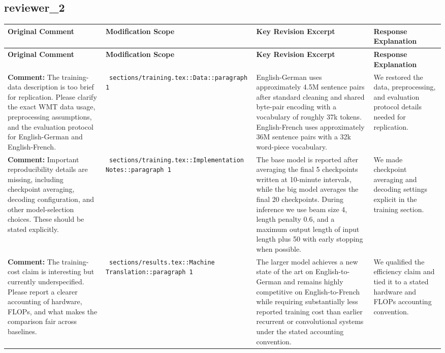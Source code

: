 \documentclass[11pt]{article}
\begin{document}
\subsection*{ reviewer\_2 }
\begin{longtable}{|p{}|p{}|p{}|p{}|}
\hline
\textbf{ Original Comment } & \textbf{ Modification Scope } & \textbf{ Key Revision Excerpt } & \textbf{ Response Explanation } \\
\hline
\endfirsthead
\hline
\textbf{ Original Comment } & \textbf{ Modification Scope } & \textbf{ Key Revision Excerpt } & \textbf{ Response Explanation } \\
\hline
\endhead
\textbf{ Comment: } The training-data description is too brief for replication. Please clarify the exact WMT data usage, preprocessing assumptions, and the evaluation protocol for English-German and English-French. & \texttt{ sections/training.tex::Data::paragraph 1 } & {\color{blue}\ttfamily English-German uses approximately 4.5M sentence pairs after standard cleaning and shared byte-pair encoding with a vocabulary of roughly 37k tokens. English-French uses approximately 36M sentence pairs with a 32k word-piece vocabulary.} & We restored the data, preprocessing, and evaluation protocol details needed for replication. \\
\hline
\textbf{ Comment: } Important reproducibility details are missing, including checkpoint averaging, decoding configuration, and other model-selection choices. These should be stated explicitly. & \texttt{ sections/training.tex::Implementation Notes::paragraph 1 } & {\color{blue}\ttfamily The base model is reported after averaging the final 5 checkpoints written at 10-minute intervals, while the big model averages the final 20 checkpoints. During inference we use beam size 4, length penalty 0.6, and a maximum output length of input length plus 50 with early stopping when possible.} & We made checkpoint averaging and decoding settings explicit in the training section. \\
\hline
\textbf{ Comment: } The training-cost claim is interesting but currently underspecified. Please report a clearer accounting of hardware, FLOPs, and what makes the comparison fair across baselines. & \texttt{ sections/results.tex::Machine Translation::paragraph 1 } & {\color{blue}\ttfamily The larger model achieves a new state of the art on English-to-German and remains highly competitive on English-to-French while requiring substantially less reported training cost than earlier recurrent or convolutional systems under the stated accounting convention.} & We qualified the efficiency claim and tied it to a stated hardware and FLOPs accounting convention. \\

\end{longtable}
\end{document}
